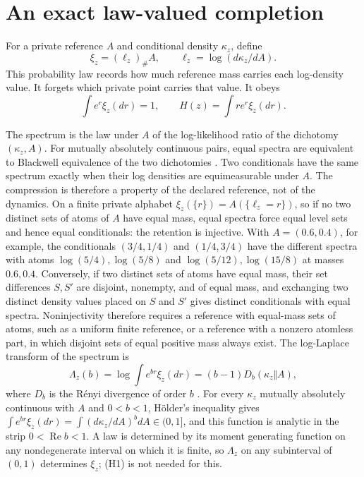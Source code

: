 \section{An exact law-valued completion}

For a private reference $A$ and conditional density $\kappa_z$, define
\begin{equation}
 \xi_z=(\ell_z)_\#A,\qquad
 \ell_z=\log(d\kappa_z/dA).
 \label{smooth:spectrum}
\end{equation}
This probability law records how much reference mass carries each log-density value. It forgets which private point carries that value. It obeys
\begin{equation}
 \int e^r\xi_z(dr)=1,\qquad
 H(z)=\int r e^r\xi_z(dr).
 \label{smooth:spectrum-normalization}
\end{equation}

The spectrum is the law under $A$ of the log-likelihood ratio of the dichotomy $(\kappa_z,A)$. For mutually absolutely continuous pairs, equal spectra are equivalent to Blackwell equivalence of the two dichotomies \citep{Blackwell1953,Torgersen1991}. Two conditionals have the same spectrum exactly when their log densities are equimeasurable under $A$. The compression is therefore a property of the declared reference, not of the dynamics. On a finite private alphabet $\xi_z(\{r\})=A(\{\ell_z=r\})$, so if no two distinct sets of atoms of $A$ have equal mass, equal spectra force equal level sets and hence equal conditionals: the retention is injective. With $A=(0.6,0.4)$, for example, the conditionals $(3/4,1/4)$ and $(1/4,3/4)$ have the different spectra with atoms $\log(5/4),\log(5/8)$ and $\log(5/12),\log(15/8)$ at masses $0.6,0.4$. Conversely, if two distinct sets of atoms have equal mass, their set differences $S,S'$ are disjoint, nonempty, and of equal mass, and exchanging two distinct density values placed on $S$ and $S'$ gives distinct conditionals with equal spectra. Noninjectivity therefore requires a reference with equal-mass sets of atoms, such as a uniform finite reference, or a reference with a nonzero atomless part, in which disjoint sets of equal positive mass always exist. The log-Laplace transform of the spectrum is
\begin{equation}
 \Lambda_z(b)=\log\int e^{br}\xi_z(dr)=(b-1)D_b(\kappa_z\Vert A),
 \label{smooth:renyi}
\end{equation}
where $D_b$ is the R\'enyi divergence of order $b$ \citep{vanErvenHarremoes2014}. For every $\kappa_z$ mutually absolutely continuous with $A$ and $0<b<1$, H\"older's inequality gives $\int e^{br}\xi_z(dr)=\int(d\kappa_z/dA)^bdA\in(0,1]$, and this function is analytic in the strip $0<\operatorname{Re}b<1$. A law is determined by its moment generating function on any nondegenerate interval on which it is finite, so $\Lambda_z$ on any subinterval of $(0,1)$ determines $\xi_z$; (H1) is not needed for this.

